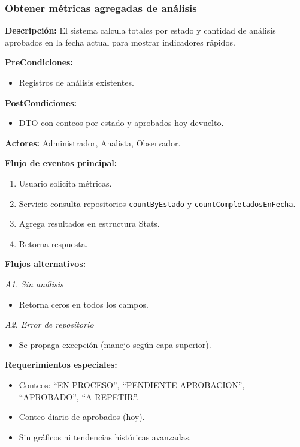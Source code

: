 \subsubsection{Obtener métricas agregadas de análisis}

\textbf{Descripción:} El sistema calcula totales por estado y cantidad de análisis aprobados en la fecha actual para mostrar indicadores rápidos.

\vspace{0.5em}
\noindent\textbf{PreCondiciones:}
\begin{itemize}[nosep]
    \item Registros de análisis existentes.
\end{itemize}

\vspace{0.5em}
\noindent\textbf{PostCondiciones:}
\begin{itemize}[nosep]
    \item DTO con conteos por estado y aprobados hoy devuelto.
\end{itemize}

\vspace{0.5em}
\noindent\textbf{Actores:} Administrador, Analista, Observador.

\vspace{0.5em}
\noindent\textbf{Flujo de eventos principal:}
\begin{enumerate}[nosep]
    \item Usuario solicita métricas.
    \item Servicio consulta repositorios \texttt{countByEstado} y \texttt{countCompletadosEnFecha}.
    \item Agrega resultados en estructura Stats.
    \item Retorna respuesta.
\end{enumerate}

\vspace{0.5em}
\noindent\textbf{Flujos alternativos:}

\vspace{0.3em}
\noindent\textit{A1. Sin análisis}
\begin{itemize}[nosep]
    \item Retorna ceros en todos los campos.
\end{itemize}

\vspace{0.3em}
\noindent\textit{A2. Error de repositorio}
\begin{itemize}[nosep]
    \item Se propaga excepción (manejo según capa superior).
\end{itemize}

\vspace{0.5em}
\noindent\textbf{Requerimientos especiales:}
\begin{itemize}[nosep]
    \item Conteos: ``EN PROCESO'', ``PENDIENTE APROBACION'', ``APROBADO'', ``A REPETIR''.
    \item Conteo diario de aprobados (hoy).
    \item Sin gráficos ni tendencias históricas avanzadas.
\end{itemize}
